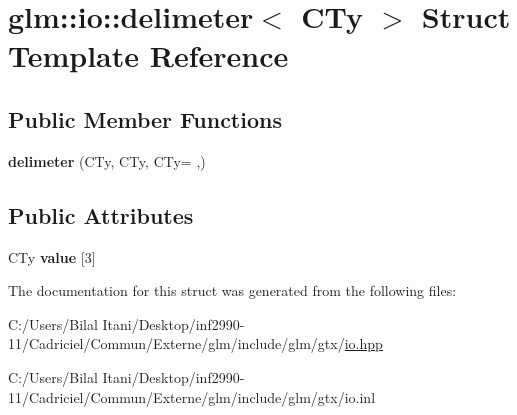 \hypertarget{structglm_1_1io_1_1delimeter}{}\section{glm\+:\+:io\+:\+:delimeter$<$ C\+Ty $>$ Struct Template Reference}
\label{structglm_1_1io_1_1delimeter}
\subsection*{Public Member Functions}
\begin{DoxyCompactItemize}
\item 
{\bfseries delimeter} (C\+Ty, C\+Ty, C\+Ty= \textquotesingle{},\textquotesingle{})\hypertarget{structglm_1_1io_1_1delimeter_acd4b6e1e816d423a069688c4772b9500}{}\label{structglm_1_1io_1_1delimeter_acd4b6e1e816d423a069688c4772b9500}

\end{DoxyCompactItemize}
\subsection*{Public Attributes}
\begin{DoxyCompactItemize}
\item 
C\+Ty {\bfseries value} \mbox{[}3\mbox{]}\hypertarget{structglm_1_1io_1_1delimeter_a9ade129dae50c4f716f724e7425f9c68}{}\label{structglm_1_1io_1_1delimeter_a9ade129dae50c4f716f724e7425f9c68}

\end{DoxyCompactItemize}


The documentation for this struct was generated from the following files\+:\begin{DoxyCompactItemize}
\item 
C\+:/\+Users/\+Bilal Itani/\+Desktop/inf2990-\/11/\+Cadriciel/\+Commun/\+Externe/glm/include/glm/gtx/\hyperlink{io_8hpp}{io.\+hpp}\item 
C\+:/\+Users/\+Bilal Itani/\+Desktop/inf2990-\/11/\+Cadriciel/\+Commun/\+Externe/glm/include/glm/gtx/io.\+inl\end{DoxyCompactItemize}
